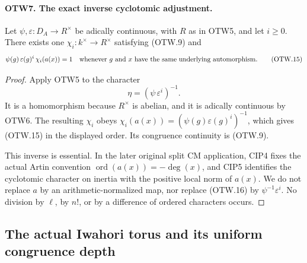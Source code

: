 \paragraph{OTW7. The exact inverse cyclotomic adjustment.}
\label{claim:OTW7}
Let $\psi,\varepsilon:D_A\to R^\times$ be adically continuous,
with $R$ as in OTW5, and let $i\geq0$.  There exists one
$\chi_i:k^\times\to R^\times$ satisfying (OTW.9) and
\[
        \psi(g)\,\varepsilon(g)^i\,\chi_i(a(x))=1
        \quad\hbox{whenever }g\hbox{ and }x
                 \hbox{ have the same underlying automorphism}.
        \tag{OTW.15}
\]
\begin{proof}
Apply OTW5 to the character
\[
                     \eta=(\psi\,\varepsilon^i)^{-1}.
                     \tag{OTW.16}
\]
It is a homomorphism because $R^\times$ is abelian, and it is
adically continuous by OTW6.  The resulting $\chi_i$ obeys
$\chi_i(a(x))=(\psi(g)\varepsilon(g)^i)^{-1}$, which gives
(OTW.15) in the displayed order.  Its congruence continuity is
(OTW.9).

This inverse is essential.  In the later original split CM
application, CIP4 fixes the actual Artin convention
$\operatorname{ord}(a(x))=-\deg(x)$, and CIP5 identifies the
cyclotomic character on inertia with the positive local norm of
$a(x)$.  We do not replace $a$ by an arithmetic-normalized map,
nor replace (OTW.16) by $\psi^{-1}\varepsilon^i$.
No division by $\ell$, by $n!$, or by a difference of ordered
characters occurs.
\end{proof}

\subsection{The actual Iwahori torus and its uniform congruence depth}

